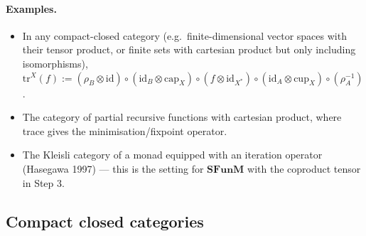 \documentclass[11pt]{article}
\newcommand{\SFunM}{\mathbf{SFunM}}
\newcommand{\id}{\mathrm{id}}
\begin{document}
\paragraph{Examples.}
\begin{itemize}
  \item In any compact-closed category (e.g.\ finite-dimensional
        vector spaces with their tensor product, or finite sets with
        cartesian product but only including isomorphisms),
        $\mathrm{tr}^X(f) := (\rho_B \otimes \id) \circ (\id_B \otimes \mathrm{cap}_X)
        \circ (f \otimes \id_{X^*}) \circ (\id_A \otimes \mathrm{cup}_X) \circ (\rho_A^{-1})$.
  \item The category of partial recursive functions with cartesian
        product, where trace gives the minimisation/fixpoint operator.
  \item The Kleisli category of a monad equipped with an iteration
        operator (Hasegawa 1997) --- this is the setting for $\SFunM$
        with the coproduct tensor in Step 3.
\end{itemize}

\subsection{Compact closed categories}
\label{sec:compact}
\end{document}
